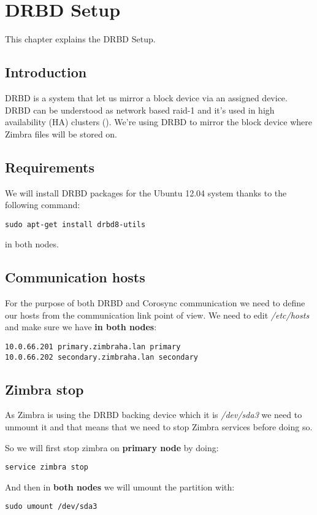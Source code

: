

\chapter{DRBD Setup}
\label{chap:drbd-setup}
This chapter explains the DRBD Setup.

\section {Introduction}
DRBD is a system that let us mirror a block device via an assigned device. DRBD can be understood as network based raid-1 and it's used in high availability (HA) clusters (\cite{LinbitDRBDWhatIs}).
We're using DRBD to mirror the block device where Zimbra files will be stored on.

\section {Requirements}
We will install DRBD packages for the Ubuntu 12.04 system thanks to the following command:
\begin{verbatim}
sudo apt-get install drbd8-utils
\end{verbatim}
in both nodes.
\section {Communication hosts}
For the purpose of both DRBD and Corosync communication we need to define our hosts from the communication link point of view. We need to edit \textit{/etc/hosts} and make sure we have \textbf{in both nodes}:

\begin{verbatim}
10.0.66.201 primary.zimbraha.lan primary
10.0.66.202 secondary.zimbraha.lan secondary
\end{verbatim}

\section {Zimbra stop}
As Zimbra is using the DRBD backing device which it is \textit{/dev/sda3} we need to unmount it and that means that we need to stop Zimbra services before doing so.

So we will first stop zimbra on \textbf{primary node} by doing:
\begin{verbatim}
service zimbra stop
\end{verbatim}

And then in \textbf{both nodes} we will umount the partition with:
\begin{verbatim}
sudo umount /dev/sda3
\end{verbatim}

